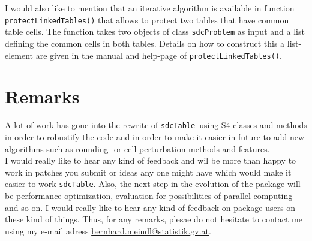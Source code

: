 \documentclass{article}
\newcommand{\sdcTable}{{\tt sdcTable}}
\begin{document}
I would also like to mention that an iterative algorithm is available in function
{\tt protectLinkedTables()} that allows to protect two tables that have common 
table cells. The function takes two objects of class {\tt sdcProblem} as input 
and a list defining the common cells in both tables. Details on how to construct 
this a list-element are given in the manual and help-page
of {\tt protectLinkedTables()}. 


\section{Remarks}
A lot of work has gone into the rewrite of \sdcTable~using S4-classes and methods
in order to robustify the code and in order to make it easier in future to add
new algorithms such as rounding- or cell-perturbation methods and features.\\

I would really like to hear any kind of feedback and wil be more than happy to 
work in patches you submit or ideas any one might have which would make it easier to 
work \sdcTable. Also, the next step in the evolution of the package will be performance
optimization, evaluation for possibilities of parallel computing and so on. I would really
like to hear any kind of feedback on package users on these kind of things. Thus, 
for any remarks, plesae do not hesitate to contact me using my e-mail adress
\url{bernhard.meindl@statistik.gv.at}.

%

\end{document}
